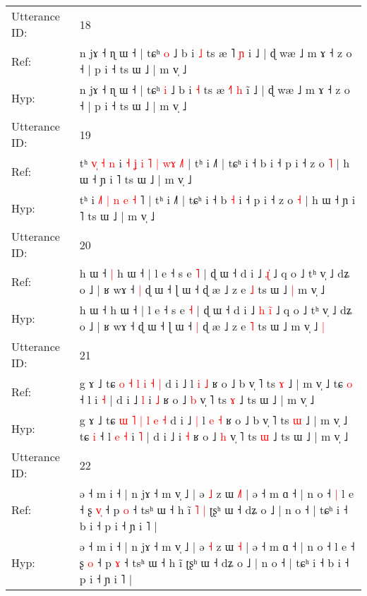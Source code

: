 \documentclass[10pt]{article}
\DeclareRobustCommand{\hl}[1]{{\textcolor{red}{#1}}}
\begin{document}
\begin{longtable}{ll}
 \\
\midrule
Utterance ID: & 18 \\
Ref: & n jɤ ˧ ɳ ɯ ˧ | tɕʰ \hl{o} ˩ b i \hl{˩} ts æ \hl{}˥ \hl{ɲ} i\hl{} ˩ | ɖ wæ ˩ m ɤ ˧ z o ˧ | p i ˧ ts ɯ ˩ | m v̩ ˩
 \\
Hyp: & n jɤ ˧ ɳ ɯ ˧ | tɕʰ \hl{i} ˩ b i \hl{˧} ts æ \hl{˧}˥ \hl{h} i\hl{̃} ˩ | ɖ wæ ˩ m ɤ ˧ z o ˧ | p i ˧ ts ɯ ˩ | m v̩ ˩
 \\
\midrule
Utterance ID: & 19 \\
Ref: & tʰ\hl{ }\hl{v}\hl{̩}\hl{ }\hl{˧}\hl{ }\hl{n} i \hl{˧}\hl{ }\hl{ʝ} \hl{i} \hl{˥} \hl{|} \hl{w}\hl{ɤ} \hl{˩}˥ | tʰ i ˩˥ | tɕʰ i ˧ b\hl{}\hl{} i ˧ p i ˧ z o \hl{˥} | h ɯ ˧ ɲ i ˥ ts ɯ ˩ | m v̩ ˩
 \\
Hyp: & tʰ\hl{}\hl{}\hl{}\hl{}\hl{}\hl{}\hl{} i \hl{}\hl{˩}\hl{˥} \hl{|} \hl{n} \hl{e} \hl{}\hl{˧} \hl{}˥ | tʰ i ˩˥ | tɕʰ i ˧ b\hl{ }\hl{˧} i ˧ p i ˧ z o \hl{˧} | h ɯ ˧ ɲ i ˥ ts ɯ ˩ | m v̩ ˩
 \\
\midrule
Utterance ID: & 20 \\
Ref: & h ɯ ˧\hl{ }\hl{|} h ɯ ˧ | l e ˧ s e \hl{˥} | ɖ ɯ ˧ d i ˩\hl{}\hl{} \hl{ɻ}\hl{̍} ˩ q o ˩ tʰ v̩ ˩ dʑ o ˩ | ʁ wɤ ˧\hl{ }\hl{|} ɖ ɯ ˧ ɭ ɯ ˧\hl{}\hl{} ɖ æ ˩ z e \hl{˩} ts ɯ ˩\hl{ }\hl{|} m v̩ ˩\hl{}\hl{}
 \\
Hyp: & h ɯ ˧\hl{}\hl{} h ɯ ˧ | l e ˧ s e \hl{˧} | ɖ ɯ ˧ d i ˩\hl{ }\hl{h} \hl{i}\hl{̃} ˩ q o ˩ tʰ v̩ ˩ dʑ o ˩ | ʁ wɤ ˧\hl{}\hl{} ɖ ɯ ˧ ɭ ɯ ˧\hl{ }\hl{|} ɖ æ ˩ z e \hl{˥} ts ɯ ˩\hl{}\hl{} m v̩ ˩\hl{ }\hl{|}
 \\
\midrule
Utterance ID: & 21 \\
Ref: & g ɤ ˩ tɕ \hl{o} \hl{˧} \hl{l} \hl{i} \hl{˧} \hl{|} d i ˩\hl{}\hl{} l \hl{i} \hl{˩} ʁ o ˩ b v̩ ˥ ts \hl{ɤ} ˩ | m v̩ ˩ tɕ \hl{o} ˧ l\hl{}\hl{}\hl{}\hl{} i \hl{˧} | d i ˩\hl{ }\hl{l} i \hl{˩} ʁ o ˩ \hl{b} v̩ ˥ ts \hl{ɤ} ˩ ts ɯ ˩ | m v̩ ˩
 \\
Hyp: & g ɤ ˩ tɕ \hl{ɯ} \hl{˥} \hl{|} \hl{l} \hl{e} \hl{˧} d i ˩\hl{ }\hl{|} l \hl{e} \hl{˧} ʁ o ˩ b v̩ ˥ ts \hl{ɯ} ˩ | m v̩ ˩ tɕ \hl{i} ˧ l\hl{ }\hl{e}\hl{ }\hl{˧} i \hl{˥} | d i ˩\hl{}\hl{} i \hl{˧} ʁ o ˩ \hl{h} v̩ ˥ ts \hl{ɯ} ˩ ts ɯ ˩ | m v̩ ˩
 \\
\midrule
Utterance ID: & 22 \\
Ref: & ə ˧ m i ˧ | n jɤ ˧ m v̩ ˩ | ə \hl{˩} z ɯ \hl{˩}\hl{˥} | ə ˧ m ɑ ˧ | n o ˧\hl{ }\hl{|} l e ˧ ʂ \hl{v}\hl{̩} ˧ p \hl{o} ˧ tsʰ ɯ ˧ h ĩ\hl{ }\hl{˥}\hl{ }\hl{|} ʈʂʰ ɯ ˧ dʑ o ˩ | n o ˧ | tɕʰ i ˧ b i ˧ p i ˧ ɲ i ˥ |
 \\
Hyp: & ə ˧ m i ˧ | n jɤ ˧ m v̩ ˩ | ə \hl{˧} z ɯ \hl{}\hl{˧} | ə ˧ m ɑ ˧ | n o ˧\hl{}\hl{} l e ˧ ʂ \hl{}\hl{o} ˧ p \hl{ɤ} ˧ tsʰ ɯ ˧ h ĩ\hl{}\hl{}\hl{}\hl{} ʈʂʰ ɯ ˧ dʑ o ˩ | n o ˧ | tɕʰ i ˧ b i ˧ p i ˧ ɲ i ˥ |

\end{longtable}
\end{document}
